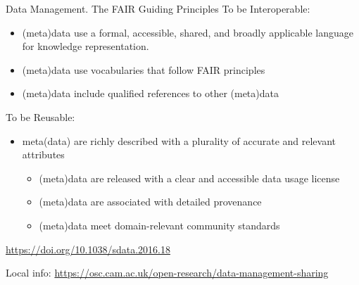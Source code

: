 \begin{frame}{Data Management. The FAIR Guiding Principles} 
To be Interoperable:
\begin{itemize}
\item (meta)data use a formal, accessible, shared, and broadly applicable language for knowledge representation.
\item (meta)data use vocabularies that follow FAIR principles
\item (meta)data include qualified references to other (meta)data
\end{itemize}

To be Reusable:
\begin{itemize}
\item meta(data) are richly described with a plurality of accurate and relevant attributes
\begin{itemize}
\item (meta)data are released with a clear and accessible data usage license
\item (meta)data are associated with detailed provenance
\item (meta)data meet domain-relevant community standards
\end{itemize}
\end{itemize}

\begin{flushright}
{\tiny \url{https://doi.org/10.1038/sdata.2016.18}}
\end{flushright}


\begin{flushright}
{\tiny
Local info: \url{https://osc.cam.ac.uk/open-research/data-management-sharing}}
\end{flushright}

\end{frame}


